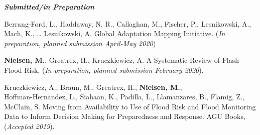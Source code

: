 \documentclass[margin, line]{res}
\begin{document}
\begin{resume}
\textit{\textbf{Submitted/in Preparation}}
\vspace*{-0.1in}\\
\begin{etaremune}[leftmargin=.2in,topsep=0in, parsep=0in]

\item Berrang-Ford, L., Haddaway, N. R., Callaghan, M., Fischer, P., Lesnikowski, A., Mach, K., … Lesnikowski, A. Global Adaptation Mapping Initiative. (\textit{In preparation, planned submission April-May 2020})

\item \textbf{Nielsen, M.}, Greatrex, H., Kruczkiewicz, A. A Systematic Review of Flash Flood Risk. (\textit{In preparation, planned submission February 2020}).

\item Kruczkiewicz, A., Braun, M., Greatrex, H., \textbf{Nielsen, M.}, \\ Hoffman-Hernandez, L., Siahaan, K., Padilla, L., Llamanzares, B., Flamig, Z., McClain, S. Moving from Availability to Use of Flood Risk and Flood Monitoring Data to Inform Decision Making for Preparedness and Response. AGU Books, (\textit{Accepted 2019}).
\end{etaremune}


\end{resume}
\end{document}
